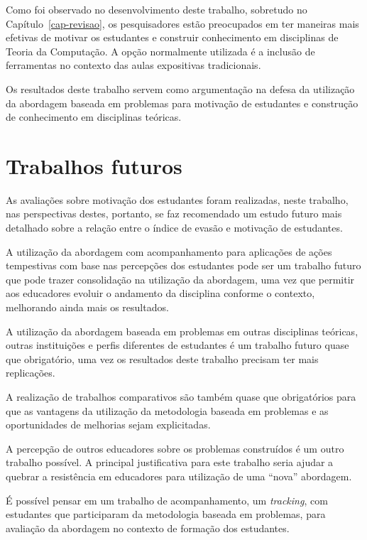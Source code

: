 \label{sec-conclusao}
\acresetall
Como foi observado no desenvolvimento deste trabalho, sobretudo
no Capítulo~\ref{cap-revisao}, 
os pesquisadores estão preocupados em ter maneiras mais
efetivas de motivar os estudantes e construir conhecimento
em disciplinas de Teoria da Computação.
A opção normalmente utilizada é a inclusão de ferramentas
no contexto das aulas expositivas tradicionais.

Os resultados deste trabalho servem como argumentação na defesa
da utilização da abordagem baseada em problemas para
motivação de estudantes e construção de conhecimento
em disciplinas teóricas.


\section{Trabalhos futuros}
As avaliações sobre motivação dos estudantes
foram realizadas, neste trabalho, nas perspectivas
destes, portanto, se faz recomendado um estudo futuro
mais detalhado sobre a relação entre o índice
de evasão e motivação de estudantes.

A utilização da abordagem com acompanhamento
para aplicações de ações tempestivas com base nas
percepções dos estudantes pode ser um trabalho futuro
que pode trazer consolidação na utilização da
abordagem, uma vez que permitir aos educadores evoluir
o andamento da disciplina conforme o contexto,
melhorando ainda mais os resultados.

A utilização da abordagem baseada em problemas em
outras disciplinas teóricas, outras instituições
e perfis diferentes de estudantes
é um trabalho futuro quase que obrigatório, uma vez
os resultados deste trabalho precisam ter mais
replicações.

A realização de trabalhos comparativos são também quase
que obrigatórios para que as vantagens da utilização
da metodologia baseada em problemas e as oportunidades
de melhorias sejam explicitadas.

A percepção de outros educadores sobre os problemas
construídos é um outro trabalho possível.
A principal justificativa para este trabalho seria
ajudar a quebrar a resistência em educadores para
utilização de uma ``nova'' abordagem.

É possível pensar em um trabalho de acompanhamento,
um \textit{tracking}, com estudantes que participaram
da metodologia baseada em problemas, para avaliação
da abordagem no contexto de formação dos estudantes.
